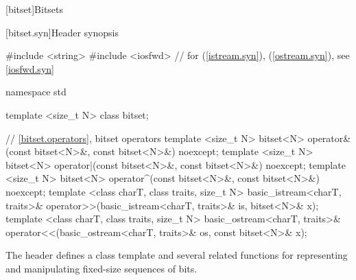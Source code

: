 [bitset]{Bitsets}
%

[bitset.syn]{Header  synopsis}%

%
%

\begin{codeblock}
#include <string>
#include <iosfwd>   // for  (\ref{istream.syn}),  (\ref{ostream.syn}), see \ref{iosfwd.syn}

namespace std {
  template <size_t N> class bitset;

  // \ref{bitset.operators}, bitset operators
  template <size_t N>
    bitset<N> operator&(const bitset<N>&, const bitset<N>&) noexcept;
  template <size_t N>
    bitset<N> operator|(const bitset<N>&, const bitset<N>&) noexcept;
  template <size_t N>
    bitset<N> operator^(const bitset<N>&, const bitset<N>&) noexcept;
  template <class charT, class traits, size_t N>
    basic_istream<charT, traits>&
      operator>>(basic_istream<charT, traits>& is, bitset<N>& x);
  template <class charT, class traits, size_t N>
    basic_ostream<charT, traits>&
      operator<<(basic_ostream<charT, traits>& os, const bitset<N>& x);
}
\end{codeblock}

\pnum
The header
defines a
class template
and several related functions for representing
and manipulating fixed-size sequences of bits.

